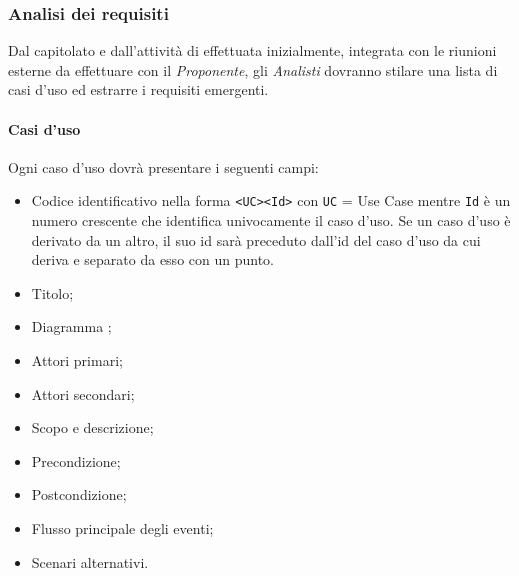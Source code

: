 \documentclass{scalatekids-article}
\begin{document}
\subsubsection{Analisi dei requisiti}
Dal capitolato e dall'attività di  effettuata inizialmente,
integrata con le riunioni esterne da effettuare con il \textit{Proponente}, gli
\textit{Analisti} dovranno stilare una lista di casi d'uso ed estrarre i
requisiti emergenti.
\paragraph{Casi d'uso}
Ogni caso d'uso dovrà presentare i seguenti campi:
\begin{itemize}
  \item Codice identificativo nella forma \verb=<UC><Id>= con \verb=UC= = Use
    Case mentre \verb=Id= è un numero crescente che identifica univocamente il
    caso d'uso. Se un caso d'uso è derivato da un altro, il suo id sarà
    preceduto dall'id del caso d'uso da cui deriva e separato da esso con un
    punto.
  \item Titolo;
  \item Diagramma ;
  \item Attori primari;
  \item Attori secondari;
  \item Scopo e descrizione;
  \item Precondizione;
  \item Postcondizione;
  \item Flusso principale degli eventi;
  \item Scenari alternativi.
\end{itemize}
\end{document}
